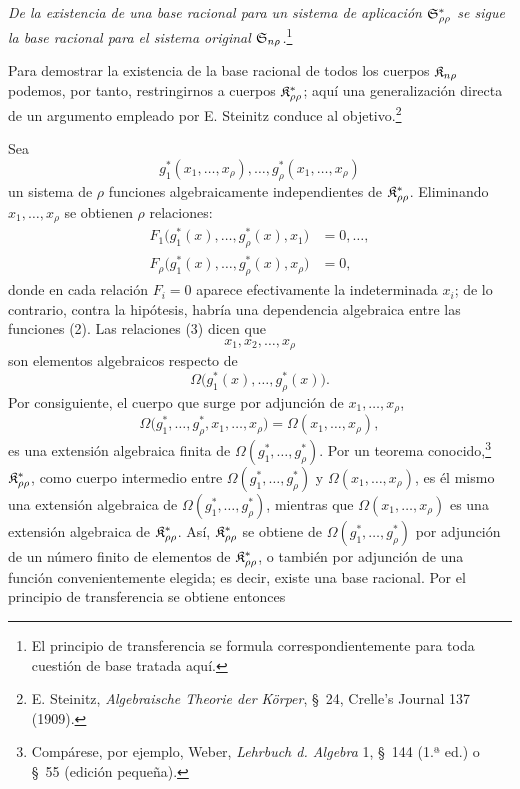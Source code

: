 \documentclass[11pt]{article}
\begin{document}
\emph{De la existencia de una base racional para un sistema de aplicación $\mathfrak{S}^*_{\rho\rho}$ se sigue la base racional para el sistema original $\mathfrak{S}_{n\rho}$.}\footnote{El principio de transferencia se formula correspondientemente para toda cuestión de base tratada aquí.}

Para demostrar la existencia de la base racional de todos los cuerpos $\mathfrak{K}_{n\rho}$ podemos, por tanto, restringirnos a cuerpos $\mathfrak{K}^*_{\rho\rho}$; aquí una generalización directa de un argumento empleado por E. Steinitz conduce al objetivo.\footnote{E. Steinitz, \emph{Algebraische Theorie der Körper}, \S\ 24, Crelle's Journal 137 (1909).}

Sea
\begin{equation}
  g_1^*(x_1,\ldots,x_\rho),\ldots,
  g_\rho^*(x_1,\ldots,x_\rho)
\tag{2}
\end{equation}
un sistema de $\rho$ funciones algebraicamente independientes de $\mathfrak{K}^*_{\rho\rho}$. Eliminando $x_1,\ldots,x_\rho$ se obtienen $\rho$ relaciones:
\begin{equation}
\begin{aligned}
  F_1\bigl(g_1^*(x),\ldots,g_\rho^*(x),x_1\bigr)&=0,\ldots,\\
  F_\rho\bigl(g_1^*(x),\ldots,g_\rho^*(x),x_\rho\bigr)&=0,
\end{aligned}
\tag{3}
\end{equation}
donde en cada relación $F_i=0$ aparece efectivamente la indeterminada $x_i$; de lo contrario, contra la hipótesis, habría una dependencia algebraica entre las funciones (2). Las relaciones (3) dicen que
\[
  x_1,x_2,\ldots,x_\rho
\]
son elementos algebraicos respecto de
\[
  \Omega\bigl(g_1^*(x),\ldots,g_\rho^*(x)\bigr).
\]
Por consiguiente, el cuerpo que surge por adjunción de $x_1,\ldots,x_\rho$,
\[
  \Omega\bigl(g_1^*,\ldots,g_\rho^*,x_1,
  \ldots,x_\rho\bigr)=\Omega(x_1,
  \ldots,x_\rho),
\]
es una extensión algebraica finita de $\Omega(g_1^*,\ldots,g_\rho^*)$. Por un teorema conocido,\footnote{Compárese, por ejemplo, Weber, \emph{Lehrbuch d. Algebra} 1, \S\ 144 (1.ª ed.) o \S\ 55 (edición pequeña).} $\mathfrak{K}^*_{\rho\rho}$, como cuerpo intermedio entre $\Omega(g_1^*,\ldots,g_\rho^*)$ y $\Omega(x_1,\ldots,x_\rho)$, es él mismo una extensión algebraica de $\Omega(g_1^*,\ldots,g_\rho^*)$, mientras que $\Omega(x_1,\ldots,x_\rho)$ es una extensión algebraica de $\mathfrak{K}^*_{\rho\rho}$. Así, $\mathfrak{K}^*_{\rho\rho}$ se obtiene de $\Omega(g_1^*,\ldots,g_\rho^*)$ por adjunción de un número finito de elementos de $\mathfrak{K}^*_{\rho\rho}$, o también por adjunción de una función convenientemente elegida; es decir, existe una base racional. Por el principio de transferencia se obtiene entonces
\end{document}
